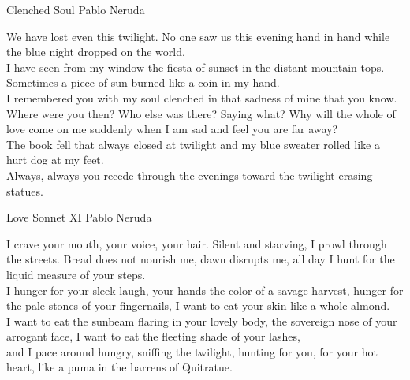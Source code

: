 \begin{poem}
{Clenched Soul}
{Pablo Neruda}

 We have lost even this twilight.
 No one saw us this evening hand in hand
 while the blue night dropped on the world.\\

 I have seen from my window
 the fiesta of sunset in the distant mountain tops.\\

 Sometimes a piece of sun 
 burned like a coin in my hand.\\

 I remembered you with my soul clenched
 in that sadness of mine that you know.\\

 Where were you then?
 Who else was there?
 Saying what?
 Why will the whole of love come on me suddenly
 when I am sad and feel you are far away?\\

 The book fell that always closed at twilight
 and my blue sweater rolled like a hurt dog at my feet.\\

 Always, always you recede through the evenings
 toward the twilight erasing statues.
\end{poem}

\begin{poem}
{Love Sonnet XI}
{Pablo Neruda}

 I crave your mouth, your voice, your hair.
 Silent and starving, I prowl through the streets.
 Bread does not nourish me, dawn disrupts me, all day
 I hunt for the liquid measure of your steps.\\
 
 I hunger for your sleek laugh,
 your hands the color of a savage harvest,
 hunger for the pale stones of your fingernails,
 I want to eat your skin like a whole almond.\\
 
 I want to eat the sunbeam flaring in your lovely body,
 the sovereign nose of your arrogant face,
 I want to eat the fleeting shade of your lashes,\\
 
 and I pace around hungry, sniffing the twilight,
 hunting for you, for your hot heart,
 like a puma in the barrens of Quitratue.
\end{poem}
